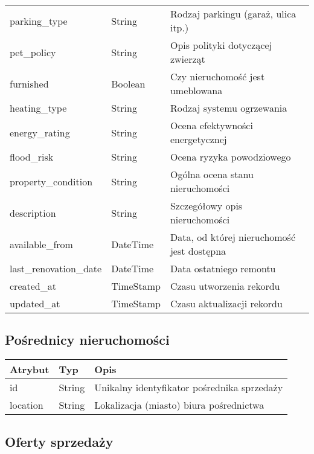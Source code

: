 \begin{table}[h]
\begin{tabular}{|l|l|l|}
    parking\_type & String & Rodzaj parkingu (garaż, ulica itp.) \\
    pet\_policy & String & Opis polityki dotyczącej zwierząt \\
    furnished & Boolean & Czy nieruchomość jest umeblowana \\
    heating\_type & String & Rodzaj systemu ogrzewania \\
    energy\_rating & String & Ocena efektywności energetycznej \\
    flood\_risk & String & Ocena ryzyka powodziowego \\
    property\_condition & String & Ogólna ocena stanu nieruchomości \\
    description & String & Szczegółowy opis nieruchomości \\
    available\_from & DateTime & Data, od której nieruchomość jest dostępna \\
    last\_renovation\_date & DateTime & Data ostatniego remontu \\
    created\_at & TimeStamp & Czasu utworzenia rekordu \\
    updated\_at & TimeStamp & Czasu aktualizacji rekordu \\
    \hline
    \end{tabular}
    \label{tab:property_details}
\end{table}

\subsection{Pośrednicy nieruchomości}

\begin{table}[h]
    \centering
    \begin{tabular}{|l|l|l|}
    \hline
    \textbf{Atrybut} & \textbf{Typ} & \textbf{Opis} \\
    \hline
    id & String & Unikalny identyfikator pośrednika sprzedaży \\
    \hline
    location & String & Lokalizacja (miasto) biura pośrednictwa \\
    \hline
    \end{tabular}
    \label{tab:sell_offer_details}
\end{table}


\subsection{Oferty sprzedaży}

